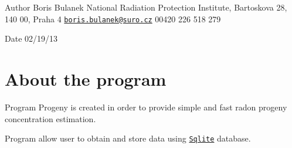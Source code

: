 \begin{DoxyAuthor}{Author}
Boris Bulanek  National Radiation Protection Institute, Bartoskova 28, 140 00, Praha 4  \href{mailto:boris.bulanek@suro.cz}{\tt boris.\-bulanek@suro.\-cz}  00420 226 518 279 
\end{DoxyAuthor}
\begin{DoxyDate}{Date}
02/19/13
\end{DoxyDate}
\hypertarget{index_about}{}\section{About the program}\label{index_about}
Program Progeny is created in order to provide simple and fast radon progeny concentration estimation.

Program allow user to obtain and store data using \href{http://www.sqlite.org}{\tt Sqlite} database.

